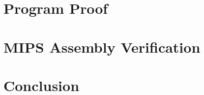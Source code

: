 \documentclass[12pt,a4paper,listof=totoc,twoside, headsepline]{scrreprt}
\begin{document}









\tableofcontents
\setcounter{page}{1}



\chapter{Program Proof}


\chapter{MIPS Assembly Verification}

\chapter{Conclusion}


{}

\end{document}
